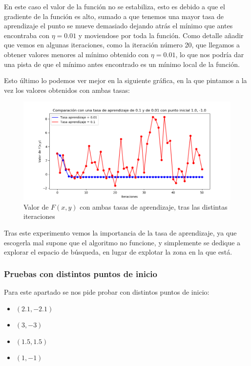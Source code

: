 \documentclass[12pt, spanish]{article}
\begin{document}
En este caso el valor de la función no se estabiliza, esto es debido a que el gradiente de la función es alto, sumado a que tenemos una mayor tasa de aprendizaje el punto se mueve demasiado dejando atrás el mínimo que antes encontraba con $\eta = 0.01$ y moviendose por toda la función. Como detalle añadir que vemos en algunas iteraciones, como la iteración número 20, que llegamos a obtener valores menores al mínimo obtenido con $\eta = 0.01$, lo que nos podría dar una pista de que el mínimo antes encontrado es un mínimo local de la función.

Esto último lo podemos ver mejor en la siguiente gráfica, en la que pintamos a la vez los valores obtenidos con ambas tasas:

\begin{figure}[H]
  \centering
      \includegraphics[scale = 0.70]{ej1-3-1-1-ite.png}
 		 \caption{Valor de $F(x,y)$ con ambas tasas de aprendizaje, tras las distintas iteraciones}
  		\label{fig:ej1-3-1-1-ite}

\end{figure}


Tras este experimento vemos la importancia de la tasa de aprendizaje, ya que escogerla mal supone que el algoritmo no funcione, y simplemente se dedique a explorar el espacio de búsqueda, en lugar de explotar la zona en la que está.

\subsubsection{Pruebas con distintos puntos de inicio}

Para este apartado se nos pide probar con distintos puntos de inicio:

\begin{itemize}
	\item $(2.1, -2.1)$
	\item $(3, -3)$
	\item $(1.5, 1.5)$
	\item $(1, -1)$
\end{itemize}
\end{document}
